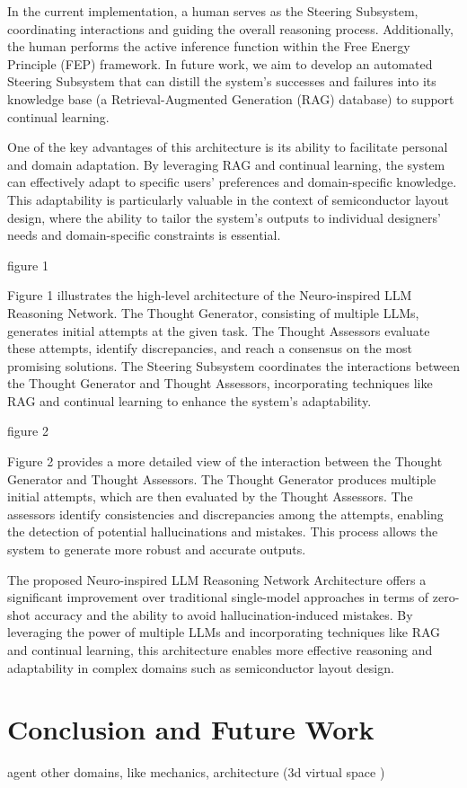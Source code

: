 \documentclass{article}
\begin{document}
In the current implementation, a human serves as the Steering Subsystem, coordinating interactions and guiding the overall reasoning process. Additionally, the human performs the active inference function within the Free Energy Principle (FEP) framework. In future work, we aim to develop an automated Steering Subsystem that can distill the system's successes and failures into its knowledge base (a Retrieval-Augmented Generation (RAG) database) to support continual learning.

One of the key advantages of this architecture is its ability to facilitate personal and domain adaptation. By leveraging RAG and continual learning, the system can effectively adapt to specific users' preferences and domain-specific knowledge. This adaptability is particularly valuable in the context of semiconductor layout design, where the ability to tailor the system's outputs to individual designers' needs and domain-specific constraints is essential.

figure 1

Figure 1 illustrates the high-level architecture of the Neuro-inspired LLM Reasoning Network. The Thought Generator, consisting of multiple LLMs, generates initial attempts at the given task. The Thought Assessors evaluate these attempts, identify discrepancies, and reach a consensus on the most promising solutions. The Steering Subsystem coordinates the interactions between the Thought Generator and Thought Assessors, incorporating techniques like RAG and continual learning to enhance the system's adaptability.

figure 2

Figure 2 provides a more detailed view of the interaction between the Thought Generator and Thought Assessors. The Thought Generator produces multiple initial attempts, which are then evaluated by the Thought Assessors. The assessors identify consistencies and discrepancies among the attempts, enabling the detection of potential hallucinations and mistakes. This process allows the system to generate more robust and accurate outputs.

The proposed Neuro-inspired LLM Reasoning Network Architecture offers a significant improvement over traditional single-model approaches in terms of zero-shot accuracy and the ability to avoid hallucination-induced mistakes. By leveraging the power of multiple LLMs and incorporating techniques like RAG and continual learning, this architecture enables more effective reasoning and adaptability in complex domains such as semiconductor layout design.

\section{Conclusion and Future Work}
agent \cite{Ho2024-cd}
other domains, like mechanics, architecture (3d virtual space \cite{Sasazawa2024-wf})

\end{document}
